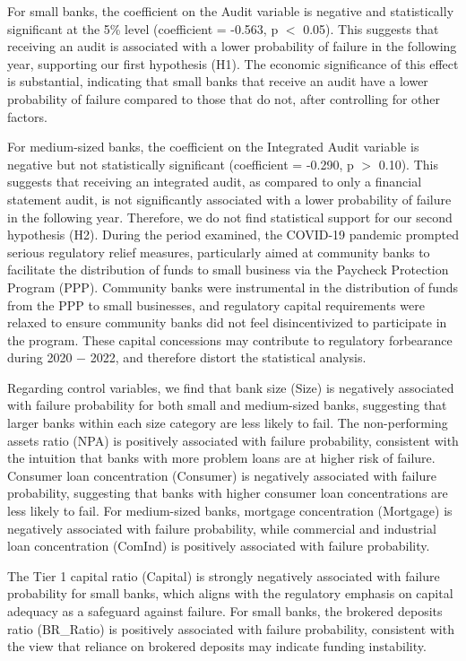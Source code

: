 \documentclass[12pt]{article}
\begin{document}
For small banks, the coefficient on the Audit variable is negative and statistically significant at the 5\% level (coefficient = -0.563, p $<$ 0.05). This suggests that receiving an audit is associated with a lower probability of failure in the following year, supporting our first hypothesis (H1). The economic significance of this effect is substantial, indicating that small banks that receive an audit have a lower probability of failure compared to those that do not, after controlling for other factors.

For medium-sized banks, the coefficient on the Integrated Audit variable is negative but not statistically significant (coefficient = -0.290, p $>$ 0.10). This suggests that receiving an integrated audit, as compared to only a financial statement audit, is not significantly associated with a lower probability of failure in the following year. Therefore, we do not find statistical support for our second hypothesis (H2). During the period examined, the COVID-19 pandemic prompted serious regulatory relief measures, particularly aimed at community banks to facilitate the distribution of funds to small business via the Paycheck Protection Program (PPP). Community banks were instrumental in the distribution of funds from the PPP to small businesses, and regulatory capital requirements were relaxed to ensure community banks did not feel disincentivized to participate in the program. These capital concessions may contribute to regulatory forbearance during 2020 $-$ 2022, and therefore distort the statistical analysis.

Regarding control variables, we find that bank size (Size) is negatively associated with failure probability for both small and medium-sized banks, suggesting that larger banks within each size category are less likely to fail. The non-performing assets ratio (NPA) is positively associated with failure probability, consistent with the intuition that banks with more problem loans are at higher risk of failure. Consumer loan concentration (Consumer) is negatively associated with failure probability, suggesting that banks with higher consumer loan concentrations are less likely to fail. For medium-sized banks, mortgage concentration (Mortgage) is negatively associated with failure probability, while commercial and industrial loan concentration (ComInd) is positively associated with failure probability.

The Tier 1 capital ratio (Capital) is strongly negatively associated with failure probability for small banks, which aligns with the regulatory emphasis on capital adequacy as a safeguard against failure. For small banks, the brokered deposits ratio (BR\_Ratio) is positively associated with failure probability, consistent with the view that reliance on brokered deposits may indicate funding instability.
\end{document}
